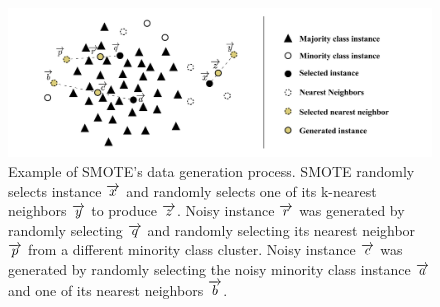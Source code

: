\documentclass[information,article,submit,moreauthors,pdftex]{Definitions/mdpi}
\begin{document}
\begin{figure}
	\centering
    \captionsetup{justification=centering}
    \caption{Example of SMOTE's data generation process. SMOTE randomly
        selects instance $\protect\overrightarrow{x}$ and randomly selects one
        of its k-nearest neighbors $\protect\overrightarrow{y}$ to produce
        $\protect\overrightarrow{z}$.  Noisy instance
        $\protect\overrightarrow{r}$ was generated by randomly selecting
        $\protect\overrightarrow{q}$ and randomly selecting its nearest
        neighbor $\protect\overrightarrow{p}$ from a different minority class
        cluster. Noisy instance $\protect\overrightarrow{c}$ was generated by
        randomly selecting the noisy minority class instance
        $\protect\overrightarrow{a}$ and one of its nearest neighbors
        $\protect\overrightarrow{b}$.
    \vspace{.2cm}}
	\label{fig:smote_example}
	\includegraphics[width=1\linewidth]{../analysis/smote_example}
\end{figure}
\end{document}
